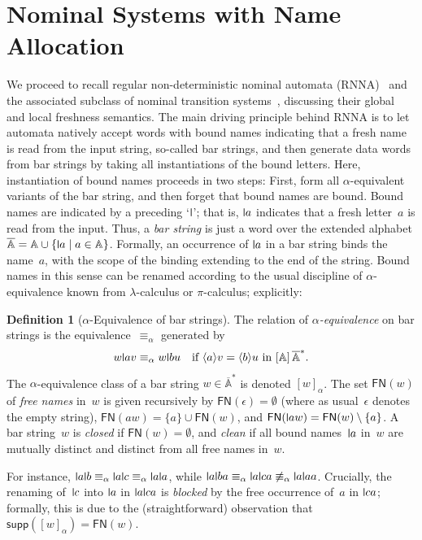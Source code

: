 \documentclass[11pt,a4paper]{amsart}
\newcommand{\FN}{\mathsf{FN}}
\newcommand{\Names}{\mathbb{A}}
\newcommand{\barNames}{\overline{\Names}}
\newcommand{\alphaeq}{\equiv_\alpha}
\newcommand{\supp}{\mathsf{supp}}
\newcommand{\bind}[1]{\langle #1\rangle}
\theoremstyle{plain}
\newcommand{\midmid}{\hspace{0.2ex}{\rule[-0.1ex]{0.6pt}{1.65ex}}\hspace{0.2ex}}
\newcommand{\newletter}[1]{{\midmid}#1}
\numberwithin{equation}{section}
\newcommand{\+}[1]{\mathcal{#1}\xspace}
\theoremstyle{definition}
\newtheorem{defn}[defn]{Definition}
\begin{document}
\section{Nominal Systems  with Name Allocation}
\label{sec:rnna}
\noindent We proceed to recall regular non-deterministic nominal
automata (RNNA)~\cite{SchroderEA17} and the associated subclass of
nominal transition systems~\cite{ParrowEA21}, discussing their global
and local freshness semantics. The main driving principle behind RNNA
is to let automata natively accept words with bound names indicating
that a fresh name is read from the input string, so-called bar
strings, and then generate data words from bar strings by taking all
instantiations of the bound letters. Here, instantiation of bound
names proceeds in two steps: First, form all $\alpha$-equivalent
variants of the bar string, and then forget that bound names are
bound. Bound names are indicated by a preceding `$\newletter$'; that
is, $\newletter a$ indicates that a fresh letter~$a$ is read from the
input. Thus, a \emph{bar string} is just a word over the extended
alphabet $\barNames=\Names\cup\{\newletter a\mid a\in\Names\}$.
Formally, an occurrence of $\newletter a$ in a bar string binds the
name~$a$, with the scope of the binding extending to the end of the
string. Bound names in this sense can be renamed according to the
usual discipline of $\alpha$-equivalence known from $\lambda$-calculus
or $\pi$-calculus; explicitly:
\begin{defn}[$\alpha$-Equivalence of bar strings]
  The relation of \emph{$\alpha$-equivalence} on bar strings is the
  equivalence~\(\alphaeq\) generated by
  \begin{equation}\label{eq:bar-alpha}
    w\newletter{a}v \alphaeq w\newletter{b}u \quad \text{if } \bind av = \bind bu
    \text{ in } [\Names]\,\barNames^*.
  \end{equation}
  The $\alpha$-equivalence class of a bar string \(w\in \barNames^*\)
  is denoted \([w]_{\alpha}\). The set $\FN(w)$ of \emph{free names}
  in~$w$ is given recursively by $\FN(\epsilon)=\emptyset$ (where as
  usual~$\epsilon$ denotes the empty string),
  $\FN(aw)=\{a\}\cup\FN(w)$, and
  $\FN(\newletter aw)=\FN(w)\setminus\{a\}$. A bar string~$w$ is
  \emph{closed} if $\FN(w)=\emptyset$, and \emph{clean} if all bound
  names~$\newletter a$ in~$w$ are mutually distinct and distinct from
  all free names in~$w$.
\end{defn}
\noindent For instance,
$\newletter a\newletter b\alphaeq\newletter a\newletter c\alphaeq
\newletter a\newletter a$, while
$\newletter a\newletter b a\alphaeq\newletter a\newletter
ca\not\alphaeq\newletter a\newletter a a$. Crucially, the renaming
of~$\newletter c$ into $\newletter a$ in $\newletter a\newletter c a$
is \emph{blocked} by the free occurrence of~$a$ in $\newletter ca$;
formally, this is due to the (straightforward) observation that
$\supp([w]_\alpha)=\FN(w)$.
\end{document}
